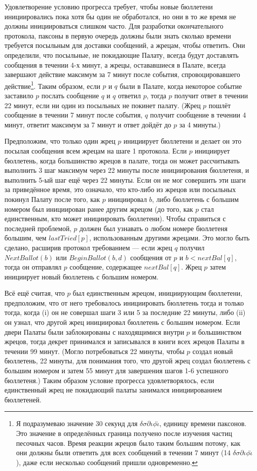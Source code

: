 \documentclass[12pt, a4paper]{article} %
\begin{document}
Удовлетворение условию прогресса требует, чтобы новые бюллетени инициировались пока хотя бы один не обработался, но они в то же время не должны инициироваться слишком часто. Для разработки окончательного протокола, паксоны в первую очередь должны были знать сколько времени требуется посыльным для доставки сообщений, а жрецам, чтобы ответить. Они определили, что посыльные, не покидающие Палату, всегда будут доставлять сообщения в течении 4-х минут, а жрецы, остававшиеся в Палате, всегда завершают действие максимум за 7 минут после события, спровоцировавшего действие\footnote{Я подразумеваю значение 30 секунд для $\delta\sigma\partial\iota\phi\check{\iota}$, единицу времени паксонов. Это значение в определённых граница получено после изучения частиц песочных часов. Время реакции жрецов было таким большим потому, как они должны были ответить для всех сообщений в течении 7 минут (14 $\delta\sigma\partial\iota\phi\check{\iota}$), даже если несколько сообщений пришли одновременно.}. Таким образом, если $p$ и $q$ были в Палате, когда некоторое событие заставило $p$ послать сообщение $q$ и $q$ ответил $p$, тогда $p$ получит ответ в течении 22 минут, если ни один из посыльных не покинет палату. (Жрец $p$ пошлёт сообщение в течении 7 минут после события, $q$ получит сообщение в течении 4 минут, ответит максимум за 7 минут и ответ дойдёт до $p$ за 4 минуты.)

Предположим, что только один жрец $p$ инициирует бюллетени и делает он это посылая сообщения всем жрецам на шаге 1 протокола. Если $p$ инициирует бюллетень, когда большинство жрецов в палате, тогда он может рассчитывать выполнить 3 шаг максимум через 22 минуты после инициирования бюллетеня, и выполнить 5-ый шаг ещё через 22 минуты. Если он не мог совершить эти шаги за приведённое время, это означало, что кто-либо из жрецов или посыльных покинул Палату после того, как $p$ инициировал $b$, либо бюллетень с большим номером был инициирован ранее другим жрецом (до того, как $p$ стал единственным, кто может инициировать бюллетени). Чтобы справиться с последней проблемой, $p$ должен был узнавать о любом номере бюллетеня большим, чем $lastTried[p]$, использованным другими жрецами. Это могло быть сделано, расширив протокол требованием --- если жрец $q$ получил $NextBallot(b)$ или $BeginBallot(b, d)$ сообщения от $p$ и $b < nextBal[q]$, тогда он отправлял $p$ сообщение, содержащее $nextBal[q]$. Жрец $p$ затем инициирует новый бюллетень с большим номером.

Всё ещё считая, что $p$ был единственным жрецом, инициирующим бюллетени, предположим, что от него требовалось инициировать бюллетень тогда и только тогда, когда (i) он не совершал шаги 3 или 5 за последние 22 минуты, либо (ii) он узнал, что другой жрец инициировал бюллетень с большим номером. Если двери Палаты были заблокированы с находящимися внутри $p$ и большинством жрецов, тогда декрет принимался и записывался в книги всех жрецов Палаты в течении 99 минут. (Могло потребоваться 22 минуты, чтобы $p$ создал новый бюллетень, 22 минуты, для понимания того, что другой жрец создал бюллетень с большим номером и затем 55 минут для завершения шагов 1-6 успешного бюллетеня.) Таким образом условие прогресса удовлетворялось, если единственный жрец не покидающий палаты занимался инициированием бюллетеней.
\end{document}
